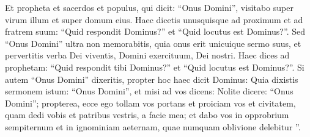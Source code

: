 \begin{biblechapter}
\begin{biblechapter}
\begin{biblechapter}
\begin{biblechapter}
\begin{biblechapter}
\begin{biblechapter}
\begin{biblechapter}
\begin{biblechapter}
\begin{biblechapter}
\begin{biblechapter}
\begin{biblechapter}
\begin{biblechapter}
\begin{biblechapter}
\begin{biblechapter}
\begin{biblechapter}
\begin{biblechapter}
\begin{biblechapter}
\begin{biblechapter}
\begin{biblechapter}
\begin{biblechapter}
\begin{biblechapter}
\begin{biblechapter}
\begin{biblechapter}
 \verse Et propheta et sacerdos et populus, qui dicit: “Onus Domini”, visitabo super virum illum et super domum eius. 
\verse Haec dicetis unusquisque ad proximum et ad fratrem suum: “Quid respondit Dominus?” et “Quid locutus est Dominus?”. 
 \verse Sed “Onus Domini” ultra non memorabitis, quia onus erit unicuique sermo suus, et pervertitis verba Dei viventis, Domini exercituum, Dei nostri. 
\verse Haec dices ad prophetam: “Quid respondit tibi Dominus?” et “Quid locutus est Dominus?”. 
\verse Si autem “Onus Domini” dixeritis, propter hoc haec dicit Dominus: Quia dixistis sermonem istum: “Onus Domini”, et misi ad vos dicens: Nolite dicere: “Onus Domini”; 
\verse propterea, ecce ego tollam vos portans et proiciam vos et civitatem, quam dedi vobis et patribus vestris, a facie mea; 
 \verse et dabo vos in opprobrium sempiternum et in ignominiam aeternam, quae numquam oblivione delebitur ”.
 

\end{biblechapter}
\end{biblechapter}
\end{biblechapter}
\end{biblechapter}
\end{biblechapter}
\end{biblechapter}
\end{biblechapter}
\end{biblechapter}
\end{biblechapter}
\end{biblechapter}
\end{biblechapter}
\end{biblechapter}
\end{biblechapter}
\end{biblechapter}
\end{biblechapter}
\end{biblechapter}
\end{biblechapter}
\end{biblechapter}
\end{biblechapter}
\end{biblechapter}
\end{biblechapter}
\end{biblechapter}
\end{biblechapter}
